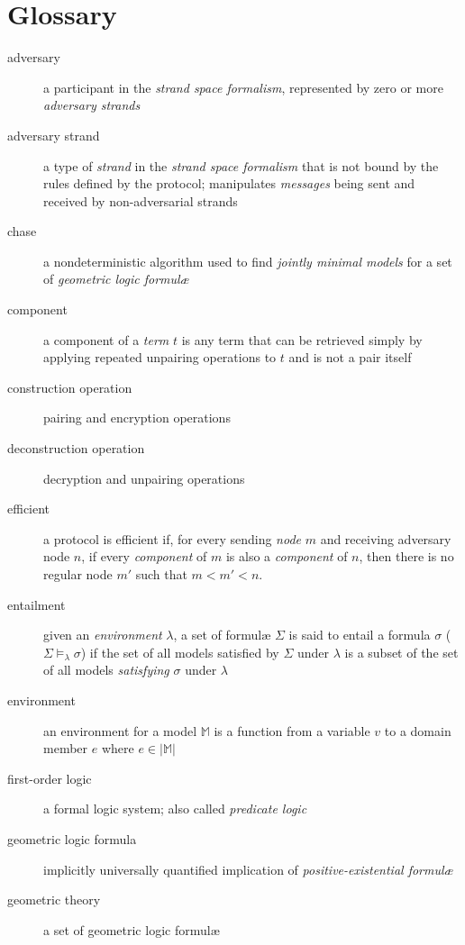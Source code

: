 \section{Glossary}
\label{sec:appendix_glossary}

	\begin{description}
		\item[adversary]
			a participant in the \emph{strand space formalism}, represented by
			zero or more \emph{adversary strands}
		\item[adversary strand]
			a type of \emph{strand} in the \emph{strand space formalism} that
			is not bound by the rules defined by the protocol; manipulates
			\emph{messages} being sent and received by non-adversarial strands
		\item[chase]
			a nondeterministic algorithm used to find \emph{jointly minimal
			models} for a set of \emph{geometric logic formul{\ae}}
		\item[component]
			a component of a \emph{term} $t$ is any term that can be retrieved
			simply by applying repeated unpairing operations to $t$ and is not
			a pair itself
		\item[construction operation]
			pairing and encryption operations
		\item[deconstruction operation]
			decryption and unpairing operations
		\item[efficient]
			a protocol is efficient if, for every sending \emph{node} $m$ and
			receiving adversary node $n$, if every \emph{component} of $m$ is
			also a \emph{component} of $n$, then there is no regular node $m'$
			such that $m < m' < n$.
		\item[entailment]
			given an \emph{environment} $\lambda$, a set of formul{\ae}
			$\Sigma$ is said to entail a formula $\sigma$ ($\Sigma
			\models_\lambda \sigma$) if the set of all models satisfied
			by $\Sigma$ under $\lambda$ is a subset of the set of all models
			\emph{satisfying} $\sigma$ under $\lambda$
		\item[environment]
			an environment for a model $\mathbb{M}$ is a function from a
			variable $v$ to a domain member $e$ where $e \in |\mathbb{M}|$
		\item[first-order logic]
			a formal logic system; also called \emph{predicate logic}
		\item[geometric logic formula]
			implicitly universally quantified implication of
			\emph{positive-existential formul{\ae}}
		\item[geometric theory]
			a set of geometric logic formul{\ae}

\end{description}
